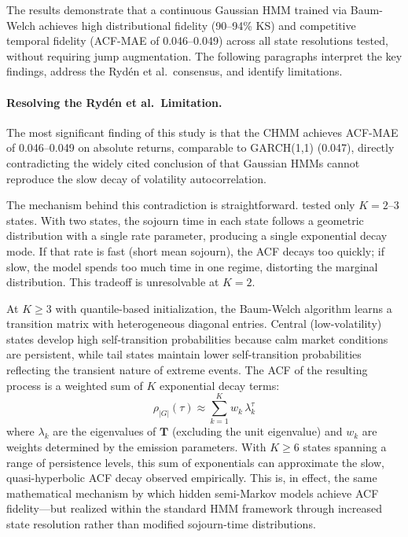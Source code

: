 The results demonstrate that a continuous Gaussian HMM trained via Baum-Welch achieves high distributional fidelity (90--94\% KS) and competitive temporal fidelity (ACF-MAE of 0.046--0.049) across all state resolutions tested, without requiring jump augmentation.
The following paragraphs interpret the key findings, address the Ryd\'{e}n et al.\ consensus, and identify limitations.

\paragraph{Resolving the Ryd\'{e}n et al.\ Limitation.}
The most significant finding of this study is that the CHMM achieves ACF-MAE of 0.046--0.049 on absolute returns, comparable to GARCH(1,1) (0.047), directly contradicting the widely cited conclusion of \citet{ryden1998stylized} that Gaussian HMMs cannot reproduce the slow decay of volatility autocorrelation.

The mechanism behind this contradiction is straightforward.
\citet{ryden1998stylized} tested only $K = 2$--$3$ states.
With two states, the sojourn time in each state follows a geometric distribution with a single rate parameter, producing a single exponential decay mode.
If that rate is fast (short mean sojourn), the ACF decays too quickly; if slow, the model spends too much time in one regime, distorting the marginal distribution.
This tradeoff is unresolvable at $K = 2$.

At $K \geq 3$ with quantile-based initialization, the Baum-Welch algorithm learns a transition matrix with heterogeneous diagonal entries.
Central (low-volatility) states develop high self-transition probabilities because calm market conditions are persistent, while tail states maintain lower self-transition probabilities reflecting the transient nature of extreme events.
The ACF of the resulting process is a weighted sum of $K$ exponential decay terms:
\begin{equation}
    \rho_{|G|}(\tau) \approx \sum_{k=1}^{K} w_k \, \lambda_k^{\tau}
    \label{eq:acf_mixture}
\end{equation}
where $\lambda_k$ are the eigenvalues of $\mathbf{T}$ (excluding the unit eigenvalue) and $w_k$ are weights determined by the emission parameters.
With $K \geq 6$ states spanning a range of persistence levels, this sum of exponentials can approximate the slow, quasi-hyperbolic ACF decay observed empirically.
This is, in effect, the same mathematical mechanism by which hidden semi-Markov models \citep{bulla2006stylized} achieve ACF fidelity---but realized within the standard HMM framework through increased state resolution rather than modified sojourn-time distributions.

